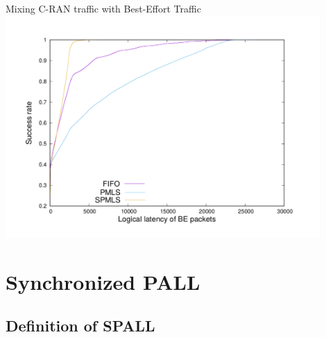\documentclass[10 pt]{beamer}
\begin{document}
\begin{frame}{Mixing C-RAN traffic with Best-Effort Traffic}
\centering
\includegraphics[width=0.9\textwidth]{res.pdf}

\end{frame}


\section{Synchronized PALL}
\subsection{Definition of SPALL}
\end{document}
